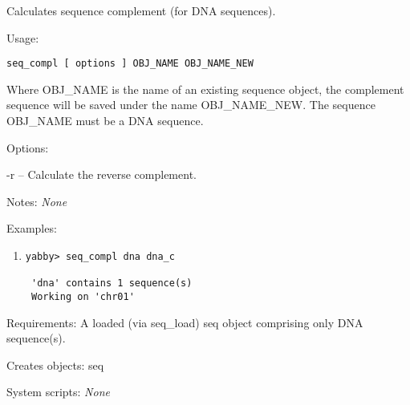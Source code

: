 

Calculates sequence complement (for DNA sequences).


\begin{description}


\item{Usage:}

{\tt seq\_compl [ options ] OBJ\_NAME OBJ\_NAME\_NEW}

 Where OBJ\_NAME is the name of an existing sequence object,
 the complement sequence will be saved under the name
 OBJ\_NAME\_NEW. The sequence OBJ\_NAME must be a DNA sequence.


\item{Options:}
\begin{description}
\item -r -- Calculate the reverse complement.
\end{description}


\item{Notes:} {\em None}


\item{Examples:}
\begin{enumerate}

\item
\begin{verbatim}
yabby> seq_compl dna dna_c

 'dna' contains 1 sequence(s)
 Working on 'chr01'

\end{verbatim}

\end{enumerate}


\item{Requirements:} A loaded (via seq\_load) seq object comprising 
                     only DNA sequence(s).


\item{Creates objects:} seq


\item{System scripts:} {\em None}

\end{description}

